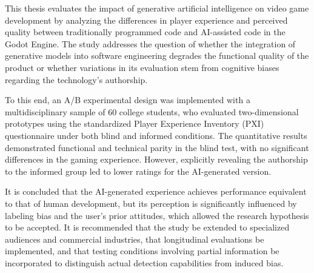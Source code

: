 This thesis evaluates the impact of generative artificial intelligence on video game development by analyzing the differences in player experience and perceived quality between traditionally programmed code and AI-assisted code in the Godot Engine. The study addresses the question of whether the integration of generative models into software engineering degrades the functional quality of the product or whether variations in its evaluation stem from cognitive biases regarding the technology’s authorship.

To this end, an A/B experimental design was implemented with a multidisciplinary sample of 60 college students, who evaluated two-dimensional prototypes using the standardized Player Experience Inventory (PXI) questionnaire under both blind and informed conditions. The quantitative results demonstrated functional and technical parity in the blind test, with no significant differences in the gaming experience. However, explicitly revealing the authorship to the informed group led to lower ratings for the AI-generated version.

It is concluded that the AI-generated experience achieves performance equivalent to that of human development, but its perception is significantly influenced by labeling bias and the user’s prior attitudes, which allowed the research hypothesis to be accepted. It is recommended that the study be extended to specialized audiences and commercial industries, that longitudinal evaluations be implemented, and that testing conditions involving partial information be incorporated to distinguish actual detection capabilities from induced bias.